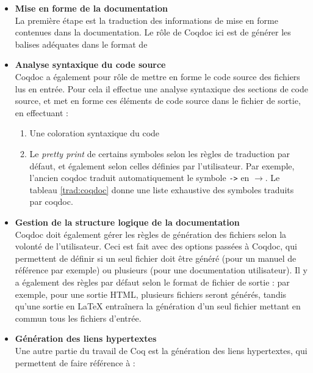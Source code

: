 \documentclass[a4paper, 11pt]{report}
\begin{document}
    \begin{itemize}
      \item \textbf{Mise en forme de la documentation} \\
        La première étape est la traduction des informations de mise en forme
        contenues dans la documentation. Le rôle de Coqdoc ici est de générer
        les balises adéquates dans le format de
      \item \textbf{Analyse syntaxique du code source} \\
        Coqdoc a également pour rôle de mettre en forme le code source des
        fichiers lus en entrée. Pour cela il effectue une analyse syntaxique
        des sections de code source, et met en forme ces éléments de code
        source dans le fichier de sortie, en effectuant :
        \begin{enumerate}
          \item Une coloration syntaxique du code
          \item Le \textit{pretty print} de certains symboles selon les règles
            de traduction par défaut, et également selon celles définies
            par l'utilisateur. Par exemple, l'ancien coqdoc traduit
            automatiquement le symbole \texttt{->} en \texttt{$\rightarrow$}.
            Le tableau \ref{trad:coqdoc} donne une liste exhaustive des
            symboles traduits par coqdoc.
        \end{enumerate}
      \item \textbf{Gestion de la structure logique de la documentation} \\
        Coqdoc doit également gérer les règles de génération des fichiers selon
        la volonté de l'utilisateur. Ceci est fait avec des options passées à
        Coqdoc, qui permettent de définir si un seul fichier doit être généré
        (pour un manuel de référence par exemple) ou plusieurs
        (pour une documentation utilisateur). Il y a également des règles par
        défaut selon le format de fichier de sortie : par exemple, pour une
        sortie HTML, plusieurs fichiers seront générés, tandis qu'une sortie
        en LaTeX entraînera la génération d'un seul fichier mettant en commun
        tous les fichiers d'entrée.
      \item \textbf{Génération des liens hypertextes} \\
        Une autre partie du travail de Coq est la génération des liens
        hypertextes, qui permettent de faire référence à :
        \begin{enumerate}

\end{enumerate}
\end{itemize}
\end{document}
